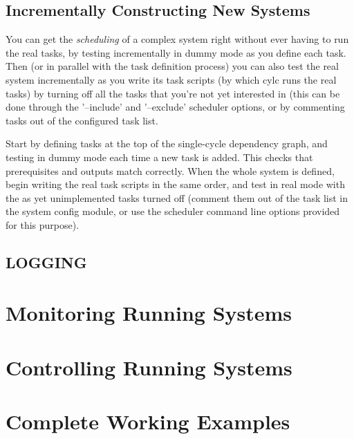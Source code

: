 \documentclass[11pt,a4paper]{article}
\begin{document}
\subsection{Incrementally Constructing New Systems} 
\label{IncrementallyConstructingNewSystems}

You can get the {\em scheduling} of a complex system right without ever
having to run the real tasks, by testing incrementally in dummy mode as
you define each task. Then (or in parallel with the task definition
process) you can also test the real system incrementally as you write
its task scripts (by which cylc runs the real tasks) by turning off all
the tasks that you're not yet interested in (this can be done through
the '--include' and '--exclude' scheduler options, or by commenting
tasks out of the configured task list.

Start by defining tasks at the top of the single-cycle dependency graph,
and testing in dummy mode each time a new task is added. This checks
that prerequisites and outputs match correctly. When the whole system is
defined, begin writing the real task scripts in the same order, and test
in real mode with the as yet unimplemented tasks turned off (comment
them out of the task list in the system config module, or use the
scheduler command line options provided for this purpose). 

\subsection{LOGGING}
\section{Monitoring Running Systems}
\label{MonitoringRunningSystems}


\section{Controlling Running Systems}
\label{ControllingRunningSystems}

\pagebreak
\section{Complete Working Examples}
\label{CompleteWorkingExamples}




\pagebreak

\end{document}
